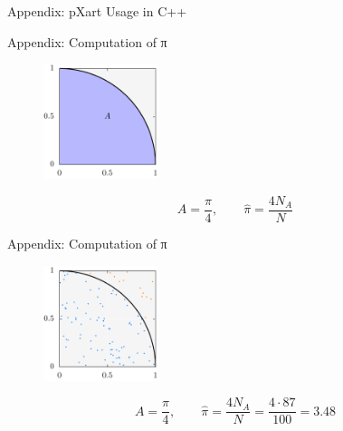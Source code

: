 \documentclass[aspectratio=169]{beamer}
\newcommand{\inputCodeBlock}[1]{%
    \begin{center}
        
    \end{center}
}
\begin{document}
  \begin{frame}{Appendix: pXart Usage in C++}
    \hspace{5em}
    \begin{minipage}[c]{0.8\textwidth}
      \inputCodeBlock{code/api.cpp}
    \end{minipage}
  \end{frame}

  \begin{frame}{Appendix: Computation of π}
    \begin{figure}
      \includegraphics[width=0.3\textwidth]{plots/monte_carlo_pi_circle.pdf}
    \end{figure}
    \begin{mybox}
      \[
        A = \frac{π}{4}, \qquad \hat{π} = \frac{4 N_A}{N}
      \]
    \end{mybox}
  \end{frame}

  \begin{frame}{Appendix: Computation of π}
    \begin{figure}
      \includegraphics[width=0.3\textwidth]{figures/monte_carlo_pi_100_87.pdf}
    \end{figure}
    \begin{mybox}
      \[
        A = \frac{π}{4}, \qquad \hat{π} = \frac{4 N_A}{N} = \frac{4 \cdot 87}{100} = 3.48
      \]
    \end{mybox}
  \end{frame}
\end{document}
